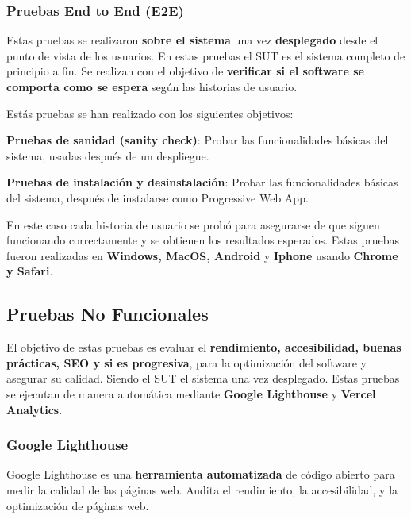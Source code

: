 \documentclass[12pt,twoside,titlepage]{report}
\begin{document}
\subsubsection{Pruebas End to End (E2E)}

Estas pruebas se realizaron \textbf{sobre el sistema} una vez \textbf{desplegado} desde el punto de vista de los usuarios. En estas pruebas el SUT es el sistema completo de principio a fin. Se realizan con el objetivo de \textbf{verificar si el software se comporta como se espera} según las historias de usuario.

Estás pruebas se han realizado con los siguientes objetivos:

\begin{compactitem}
    \item \textbf{Pruebas de sanidad (sanity check)}: Probar las funcionalidades básicas del sistema, usadas después de un despliegue.
    \item \textbf{Pruebas de instalación y desinstalación}: Probar las funcionalidades básicas del sistema, después de instalarse como Progressive Web App.
\end{compactitem}

En este caso cada historia de usuario se probó para asegurarse de que siguen funcionando correctamente y se obtienen los resultados esperados. Estas pruebas fueron realizadas en \textbf{Windows, MacOS, Android} y \textbf{Iphone} usando \textbf{Chrome y Safari}.

\subsection{Pruebas No Funcionales}

El objetivo de estas pruebas es evaluar el \textbf{rendimiento, accesibilidad, buenas prácticas, SEO y si es progresiva}, para la optimización del software y asegurar su calidad. Siendo el SUT el sistema una vez desplegado. Estas pruebas se ejecutan de manera automática mediante \textbf{Google Lighthouse} y \textbf{Vercel Analytics}.

\subsubsection{Google Lighthouse}

Google Lighthouse es una \textbf{herramienta automatizada} de código abierto para medir la calidad de las páginas web. Audita el rendimiento, la accesibilidad, y la optimización de páginas web.
\end{document}

